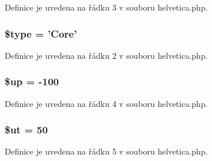 Definice je uvedena na řádku 3 v souboru helvetica.\-php.

\hypertarget{helvetica_8php_a9a4a6fba2208984cabb3afacadf33919}{
\subsubsection[{\$type}]{\setlength{\rightskip}{0pt plus 5cm}\$type = 'Core'}}\label{helvetica_8php_a9a4a6fba2208984cabb3afacadf33919}


Definice je uvedena na řádku 2 v souboru helvetica.\-php.

\hypertarget{helvetica_8php_a6b5ad2ac55f9df46e8f34e78fbd6f176}{
\subsubsection[{\$up}]{\setlength{\rightskip}{0pt plus 5cm}\$up = -\/100}}\label{helvetica_8php_a6b5ad2ac55f9df46e8f34e78fbd6f176}


Definice je uvedena na řádku 4 v souboru helvetica.\-php.

\hypertarget{helvetica_8php_aadd3f841051043ee58e587e840e8dd0b}{
\subsubsection[{\$ut}]{\setlength{\rightskip}{0pt plus 5cm}\$ut = 50}}\label{helvetica_8php_aadd3f841051043ee58e587e840e8dd0b}


Definice je uvedena na řádku 5 v souboru helvetica.\-php.

